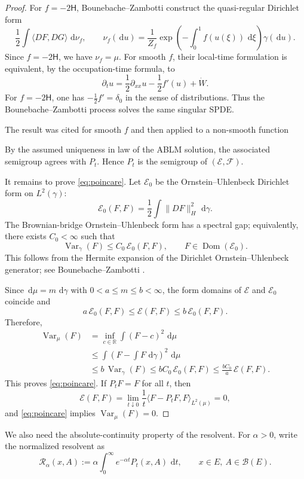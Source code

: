 \documentclass[12pt]{article}
\numberwithin{equation}{section}
\newcommand{\dd}{\,\mathrm d}
\newcommand{\1}{\mathbf 1}
\newcommand{\R}{\mathbb R}
\newcommand{\cB}{\mathcal B}
\newcommand{\cE}{\mathcal E}
\newcommand{\cF}{\mathcal F}
\newcommand{\Var}{\operatorname{Var}}
\newcommand{\review}[1]{\begin{reviewbox}#1\end{reviewbox}}
\begin{document}
\begin{proof}
For $f=-2\mathsf H$, Bounebache--Zambotti \cite[Propositions 2.4 and 3.1]{BZ14}
construct the quasi-regular Dirichlet form
\[
        \frac12\int \langle DF,DG\rangle\,\dd\nu_f,
        \qquad
        \nu_f(\dd u)=\frac1{Z_f}\exp\!\left(-\int_0^1 f(u(\xi))\,\dd\xi\right)\gamma(\dd u).
\]
Since $f=-2\mathsf H$, we have $\nu_f=\mu$. For smooth $f$, their local-time
formulation is equivalent, by the occupation-time formula, to
\[
        \partial_t u=\frac12\partial_{xx}u-\frac12 f'(u)+\dot W.
\]
For $f=-2\mathsf H$, one has $-\frac12 f'=\delta_0$ in the sense of distributions.
Thus the Bounebache--Zambotti process solves the same singular SPDE. \review{The result was cited for smooth $f$ and then applied to a non-smooth function} By the
assumed uniqueness in law of the ABLM solution, the associated semigroup agrees
with $P_t$. Hence $P_t$ is the semigroup of $(\cE,\cF)$.

It remains to prove \eqref{eq:poincare}. Let $\cE_0$ be the Ornstein--Uhlenbeck
Dirichlet form on $L^2(\gamma)$:
\[
        \cE_0(F,F)=\frac12\int \|DF\|_H^2\,\dd\gamma .
\]
The Brownian-bridge Ornstein--Uhlenbeck form has a spectral gap; equivalently,
there exists $C_0<\infty$ such that
\[
        \Var_\gamma(F)\leq C_0\,\cE_0(F,F),
        \qquad F\in\operatorname{Dom}(\cE_0).
\]
This follows from the Hermite expansion of the Dirichlet Ornstein--Uhlenbeck
generator; see Bounebache--Zambotti \cite[Proposition 2.1]{BZ14}.

Since $\dd\mu=m\,\dd\gamma$ with $0<a\leq m\leq b<\infty$, the form domains of
$\cE$ and $\cE_0$ coincide and
\[
        a\,\cE_0(F,F)\leq \cE(F,F)\leq b\,\cE_0(F,F).
\]
Therefore,
\[
\begin{aligned}
        \Var_\mu(F)
        &=\inf_{c\in\R}\int (F-c)^2\,\dd\mu                                      \\
        &\leq \int \left(F-\int F\,\dd\gamma\right)^2\,\dd\mu                       \\
        &\leq b\,\Var_\gamma(F)
        \leq bC_0\,\cE_0(F,F)
        \leq \frac{bC_0}{a}\,\cE(F,F).
\end{aligned}
\]
This proves \eqref{eq:poincare}. If $P_tF=F$ for all $t$, then
\[
        \cE(F,F)
        =
        \lim_{t\downarrow0}\frac1t\langle F-P_tF,F\rangle_{L^2(\mu)}
        =0,
\]
and \eqref{eq:poincare} implies $\Var_\mu(F)=0$.
\end{proof}

We also need the absolute-continuity property of the resolvent. For $\alpha>0$,
write the normalized resolvent as
\[
        \mathcal R_\alpha(x,A)
        :=
        \alpha\int_0^\infty e^{-\alpha t}P_t(x,A)\,\dd t,
        \qquad x\in E,\ A\in\cB(E).
\]
\end{document}
